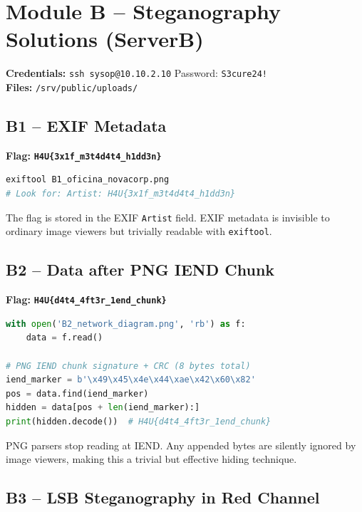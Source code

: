 \documentclass[a4paper, 12pt]{article}
\newcommand{\flag}[1]{\texttt{\color{flagcolor}\bfseries #1}}
\begin{document}
\section{Module B -- Steganography Solutions (ServerB)}

\textbf{Credentials:} \texttt{ssh sysop@10.10.2.10} \quad Password: \texttt{S3cure24!}\\
\textbf{Files:} \texttt{/srv/public/uploads/}

\subsection{B1 -- EXIF Metadata}

\textbf{Flag:} \flag{H4U\{3x1f\_m3t4d4t4\_h1dd3n\}}

\begin{lstlisting}[language=bash]
exiftool B1_oficina_novacorp.png
# Look for: Artist: H4U{3x1f_m3t4d4t4_h1dd3n}
\end{lstlisting}

The flag is stored in the EXIF \texttt{Artist} field. EXIF metadata is invisible
to ordinary image viewers but trivially readable with \texttt{exiftool}.

\subsection{B2 -- Data after PNG IEND Chunk}

\textbf{Flag:} \flag{H4U\{d4t4\_4ft3r\_1end\_chunk\}}

\begin{lstlisting}[language=python]
with open('B2_network_diagram.png', 'rb') as f:
    data = f.read()

# PNG IEND chunk signature + CRC (8 bytes total)
iend_marker = b'\x49\x45\x4e\x44\xae\x42\x60\x82'
pos = data.find(iend_marker)
hidden = data[pos + len(iend_marker):]
print(hidden.decode())  # H4U{d4t4_4ft3r_1end_chunk}
\end{lstlisting}

PNG parsers stop reading at IEND. Any appended bytes are silently ignored by
image viewers, making this a trivial but effective hiding technique.

\subsection{B3 -- LSB Steganography in Red Channel}
\end{document}
